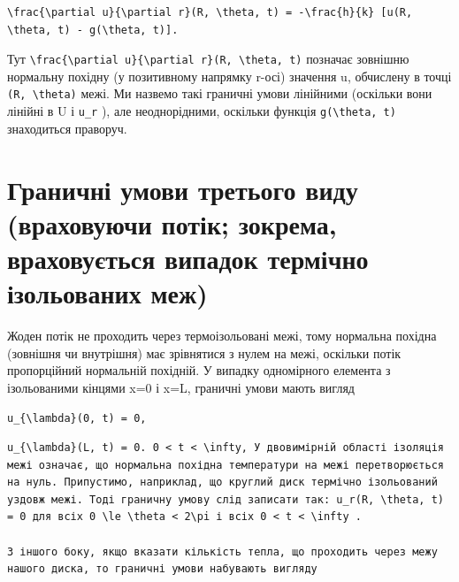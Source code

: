 \documentclass[
  ukrainian,
]{article}
\begin{document}
\begin{verbatim}
\frac{\partial u}{\partial r}(R, \theta, t) = -\frac{h}{k} [u(R, \theta, t) - g(\theta, t)].
\end{verbatim}

Тут
\texttt{\textbackslash{}frac\{\textbackslash{}partial\ u\}\{\textbackslash{}partial\ r\}(R,\ \textbackslash{}theta,\ t)}
позначає зовнішню нормальну похідну (у позитивному напрямку r-осі)
значення u, обчислену в точці \texttt{(R,\ \textbackslash{}theta)} межі.
Ми назвемо такі граничні умови лінійними (оскільки вони лінійні в U і
\texttt{u\_r} ), але неоднорідними, оскільки функція
\texttt{g(\textbackslash{}theta,\ t)} знаходиться праворуч.

\section{Граничні умови третього виду (враховуючи потік; зокрема,
враховується випадок термічно ізольованих
меж)}\label{ux433ux440ux430ux43dux438ux447ux43dux456-ux443ux43cux43eux432ux438-ux442ux440ux435ux442ux44cux43eux433ux43e-ux432ux438ux434ux443-ux432ux440ux430ux445ux43eux432ux443ux44eux447ux438-ux43fux43eux442ux456ux43a-ux437ux43eux43aux440ux435ux43cux430-ux432ux440ux430ux445ux43eux432ux443ux454ux442ux44cux441ux44f-ux432ux438ux43fux430ux434ux43eux43a-ux442ux435ux440ux43cux456ux447ux43dux43e-ux456ux437ux43eux43bux44cux43eux432ux430ux43dux438ux445-ux43cux435ux436}

Жоден потік не проходить через термоізольовані межі, тому нормальна
похідна (зовнішня чи внутрішня) має зрівнятися з нулем на межі, оскільки
потік пропорційний нормальній похідній. У випадку одномірного елемента з
ізольованими кінцями x=0 і x=L, граничні умови мають вигляд

\texttt{\textquotesingle{}u\_\{\textbackslash{}lambda\}\textquotesingle{}(0,\ t)\ =\ 0,}

\begin{verbatim}
u_{\lambda}(L, t) = 0. 0 < t < \infty, У двовимірній області ізоляція межі означає, що нормальна похідна температури на межі перетворюється на нуль. Припустимо, наприклад, що круглий диск термічно ізольований уздовж межі. Тоді граничну умову слід записати так: u_r(R, \theta, t) = 0 для всіх 0 \le \theta < 2\pi і всіх 0 < t < \infty .

З іншого боку, якщо вказати кількість тепла, що проходить через межу нашого диска, то граничні умови набувають вигляду
\end{verbatim}
\end{document}
